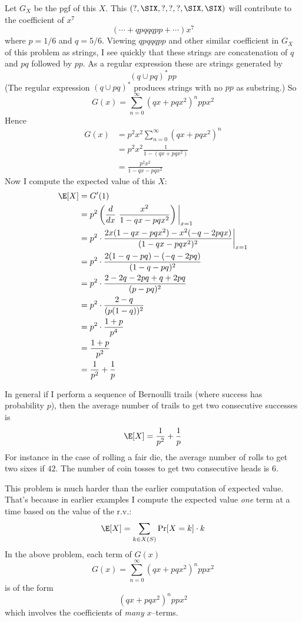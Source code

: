 Let $G_X$ be the pgf of this $X$.
This $(?, \SIX, ?, ?, ?, \SIX, \SIX)$
will contribute to the coefficient of $x^7$
\[
( \cdots + qpqqqpp + \cdots )x^7
\]
where $p = 1/6$ and $q = 5/6$.
Viewing $qpqqqpp$ and other similar coefficient
in $G_X$ of this problem as strings,
I see quickly that these strings are concatenation of
$q$ and $pq$ followed by $pp$.
As a regular expression these are strings generated by
\[
(q \cup pq)^* pp
\]
(The regular expression $(q \cup pq)^*$ produces strings with no
$pp$ as substring.)     
So
\[
G(x) = \sum_{n = 0}^\infty (qx + pqx^2)^n ppx^2
\]
Hence
\begin{align*}
  G(x)
  &= p^2x^2 \sum_{n = 0}^\infty (qx + pqx^2)^n \\
  &= p^2x^2 \frac{1}{1 - (qx + pqx^2)} \\
  &= \frac{p^2x^2}{1 - qx - pqx^2} 
\end{align*}
Now I compute the expected value of this $X$:
\begin{align*}
  \E[X]
  &= G'(1) \\
  &= p^2 \left( \frac{d}{dx} \ \frac{x^2}{1 - qx - pqx^2} \right) \biggl|_{x = 1} \\
  &= p^2 \cdot \frac{2x(1 - qx - pqx^2) - x^2(-q -2pqx)}{(1 - qx - pqx^2)^2} \biggl|_{x = 1} \\
  &= p^2 \cdot \frac{2(1 - q - pq) - (-q -2pq)}{(1 - q - pq)^2} \\
  &= p^2 \cdot \frac{2 - 2q - 2pq + q + 2pq}{(p - pq)^2} \\
  &= p^2 \cdot \frac{2 - q}{(p(1 - q))^2} \\
  &= p^2 \cdot \frac{1 + p}{p^4} \\
  &= \frac{1 + p}{p^2} \\
  &= \frac{1}{p^2} + \frac{1}{p} 
\end{align*}

In general if I perform a sequence of Bernoulli trails (where success has probability $p$),
then the average number of trails to get two consecutive successes is
\begin{align*}
  \E[X]
  &= \frac{1}{p^2} + \frac{1}{p} \\
\end{align*}
For instance in the case of rolling a fair die, the average number of rolls
to get two sixes if $42$.
The number of coin tosses to get two consecutive heads is $6$.

This problem is much harder than the earlier computation of
expected value.
That's because in earlier examples I compute the expected value
\textit{one} term at a time based on the value of the r.v.:
\[
\E[X] = \sum_{k \in X(S)} \Pr[X = k] \cdot k
\]
In the above problem, each term of $G(x)$
\[
G(x) = \sum_{n = 0}^\infty (qx + pqx^2)^n ppx^2
\]
is of the form
\[
(qx + pqx^2)^n ppx^2
\]
which involves the coefficients of \textit{many} $x$--terms.





